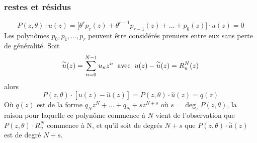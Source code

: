 \documentclass[a4paper,10.5pt]{article}
\begin{document}
	\subsubsection{restes et résidus}
	\begin{equation}
	P(z,\theta) \cdot u(z)=\big[\theta^{r}p_r(z)+\theta^{r-1}p_{r-1}(z)+...+p_0(z)\big]\cdot u(z)=0
	\label{Eqdiff}
	\end{equation}
	Les polynômes $p_0,p_1,...,p_r$ peuvent être considérés premiers entre eux sans perte de généralité. Soit
	 \[\overset{\sim}{u}(z)=\sum_{n=0}^{N-1}u_n z^n\hspace{2mm}\text{avec}\hspace{2mm}u(z)-\overset{\sim}{u}(z)=R_u^{N}(z)\] 
	alors 
	\[  P(z,\theta) \cdot [u(z)-\overset{\sim}{u}(z)]=P(z,\theta)\cdot \overset{\sim}{u}(z)=q(z)\]
	Où $q(z)$ est de la forme $q_Nz^N+...+q_N+sz^{N+s}$ où $s= \deg_{z}P(z,\theta)$, la raison pour laquelle ce polynôme commence à $N$ vient de l'observation que 
	$P(z,\theta)\cdot R_u^{N}$ commence à N, et qu'il soit de degrés $N+s$ que $P(z,\theta)\cdot\overset{\sim}{u}(z)$ est de degré $N+s$.
	\\
\end{document}
